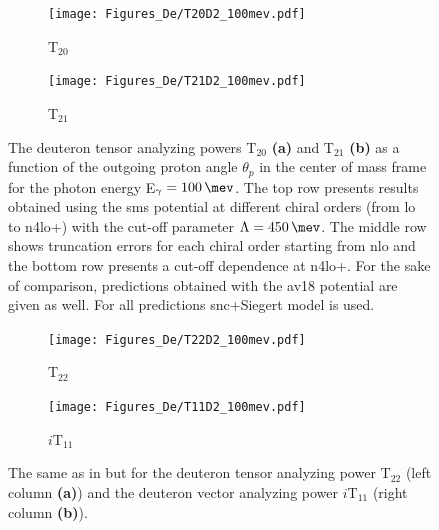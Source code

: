     \begin{figure}[htb]
        \centering
        \begin{subfigure}[b]{0.46\textwidth}
            \caption{T$_{20}$}
            \texttt{[image: Figures\_De/T20D2\_100mev.pdf]}
            \label{T20_100_vert}
        \end{subfigure}
        \begin{subfigure}[b]{0.46\textwidth}
            \caption{T$_{21}$}
            \texttt{[image: Figures\_De/T21D2\_100mev.pdf]}
            \label{T21_100_vert}
        \end{subfigure}
        \caption{The deuteron tensor analyzing powers T$_{20}$  {\bf (a)}
        and T$_{21}$ {\bf (b)}
        as a function of the outgoing proton angle $\theta_p$ in the center of mass frame 
        for the photon energy E$_\gamma=\SI{100}{\mev}$.
        The top row presents results obtained using the \gls{sms} potential
        at different chiral orders (from \gls{lo} to \gls{n4lo+}) with the cut-off parameter $\Lambda=\SI{450}{\mev}$.
        The middle row shows truncation errors for each 
        chiral order starting from \gls{nlo} and the
        bottom row presents a cut-off dependence at \gls{n4lo+}.
        For the sake of comparison, predictions obtained with the \gls{av18} potential are given as well.
        For all predictions \gls{snc}+Siegert model is used.}
        \label{T20_T21_100}
    \end{figure}

    \begin{figure}[htb]
        \centering
        \begin{subfigure}[b]{0.46\textwidth}
            \caption{T$_{22}$}
            \texttt{[image: Figures\_De/T22D2\_100mev.pdf]}
            \label{T22_100_vert}
        \end{subfigure}
        \begin{subfigure}[b]{0.46\textwidth}
            \caption{$i\text{T}_{11}$}
            \texttt{[image: Figures\_De/T11D2\_100mev.pdf]}
            \label{T11_100_vert}
        \end{subfigure}
        \caption{The same as in  but for the deuteron tensor analyzing power
        T$_{22}$ (left column {\bf (a)}) and
        the deuteron vector analyzing power $i\text{T}_{11}$
        (right column {\bf (b)}).}
        \label{T22_T11_100}
    \end{figure}

